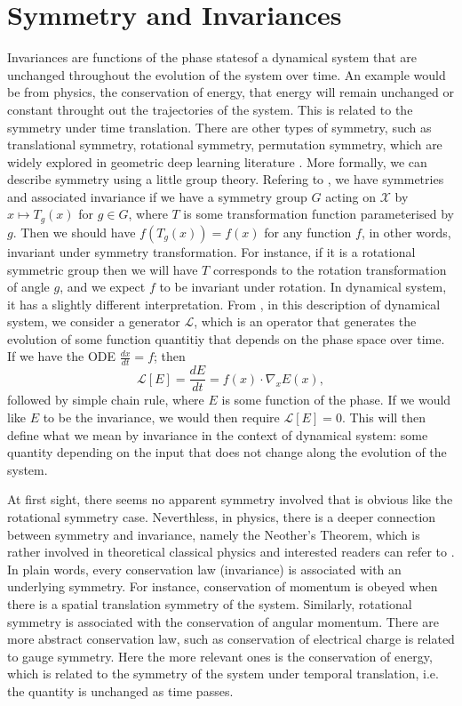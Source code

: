 \documentclass{statsmsc}
\begin{document}
\section{Symmetry and Invariances}
Invariances are functions of the phase statesof a dynamical system that are unchanged throughout the evolution of the system over time. 
An example would be from physics, the conservation of energy, that energy will remain unchanged or constant throught out the trajectories of the system.
This is related to the symmetry under time translation.
There are other types of symmetry, such as translational symmetry, rotational symmetry, permutation symmetry, which are widely explored in geometric deep learning literature \cite{Bronstein2017}. 
More formally, we can describe symmetry using a little group theory.
Refering to \cite{Kondor2008}, we have symmetries and associated invariance if we have a symmetry group $G$ acting on $\mathcal{X}$ by $x\mapsto T_g(x)$ for $g\in G$, where $T$ is some transformation function parameterised by $g$. 
Then we should have $f(T_g(x))=f(x)$ for any function $f$, in other words, invariant under symmetry transformation.
For instance, if it is a rotational symmetric group then we will have $T$ corresponds to the rotation transformation of angle $g$, and we expect $f$ to be invariant under rotation.
In dynamical system, it has a slightly different interpretation.
From \cite{marsden_sirovich_antman_2008}, in this description of dynamical system, we consider a generator $\mathcal{L}$, which is an operator that generates the evolution of some function quantitiy that depends on the phase space over time.
If we have the ODE $\frac{dx}{dt}=f$; then $$\mathcal{L}[E]=\frac{dE}{dt}=f(x)\cdot \nabla_x E(x),$$ followed by simple chain rule, where $E$ is some function of the phase.
If we would like $E$ to be the invariance, we would then require $\mathcal{L}[E]=0$. 
This will then define what we mean by invariance in the context of dynamical system: some quantity depending on the input that does not change along the evolution of the system.

At first sight, there seems no apparent symmetry involved that is obvious like the rotational symmetry case. 
Neverthless, in physics, there is a deeper connection between symmetry and invariance, namely the Neother's Theorem, which is rather involved in theoretical classical physics and interested readers can refer to \cite{lemos_2018}.
In plain words, every conservation law (invariance) is associated with an underlying symmetry.
For instance, conservation of momentum is obeyed when there is a spatial translation symmetry of the system. 
Similarly, rotational symmetry is associated with the conservation of angular momentum.
There are more abstract conservation law, such as conservation of electrical charge is related to gauge symmetry.
Here the more relevant ones is the conservation of energy, which is related to the symmetry of the system under temporal translation, i.e. the quantity is unchanged as time passes.
\end{document}
